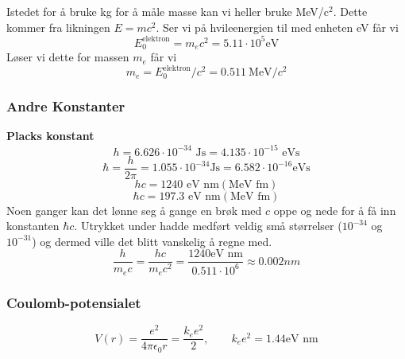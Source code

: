 \documentclass{article}
\begin{document}
Istedet for å bruke kg for å måle masse kan vi heller bruke MeV/c$^{2}$. Dette kommer fra likningen $ E = mc^{2} $. Ser vi på hvileenergien til med enheten eV får vi 
\[
E_{0}^{\text{elektron}} = m_{e} c^{2} = 5.11 \cdot 10^{5} \text{eV}
\]
Løser vi dette for massen $ m_{e} $ får vi
\[
m_e = E_{0}^{\text{elektron}} / c^{2} = 0.511\ \text{MeV}/c^{2}
\]

\subsubsection*{Andre Konstanter}
\textbf{Placks konstant}
\[
h = 6.626 ⋅  10^{-34} \text{ Js} = 4.135 ⋅ 10^{-15} \text{  eVs}
\]
\[
ℏ = \frac{h}{2 \pi} = 1.055 ⋅ 10^{-34} \text{Js} = 6.582 ⋅ 10^{-16} \text{eVs} 
\]
\[
hc = 1240 \text{ eV nm} (\text{MeV fm})
\]
\[
ℏc = 197.3 \text{ eV nm} (\text{MeV fm})
\]
Noen ganger kan det lønne seg å gange en brøk med $ c $ oppe og nede for å få inn konstanten $ ℏc $. Utrykket under hadde medført veldig små størrelser ($ 10^{-34} $ og $ 10^{-31} $) og dermed ville det blitt vanskelig å regne med. 
\[
\frac{h}{m_e c} = \frac{hc}{m_e c^{2}} = \frac{1240 \text{eV nm}}{0.511 ⋅ 10^{6}} ≈ 0.002 nm
\]
\subsubsection*{Coulomb-potensialet}
\[
V(r) = \frac{e^{2}}{4 \pi \epsilon_{0} r} = \frac{k_e e^{2}}{2}, \qquad k_e e^{2} = 1.44 \text{eV nm}
\]
\end{document}
